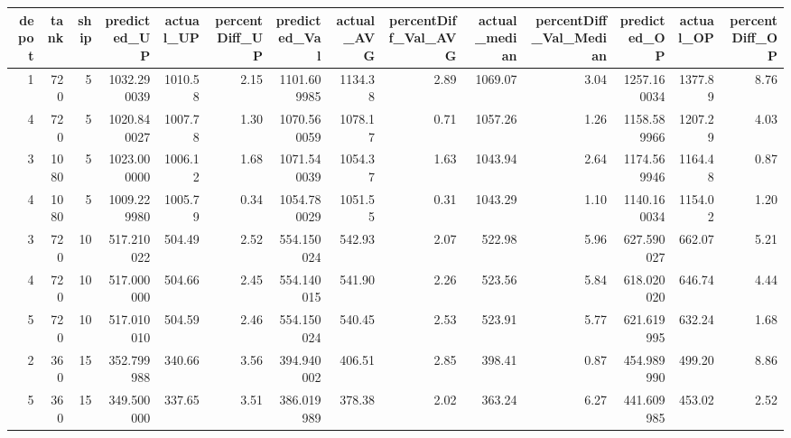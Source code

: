 \begin{tabular}{rrrrrrrrrrrrrr}
\toprule
 depot &  tank &  ship &  predicted\_UP &  actual\_UP &  percentDiff\_UP &  predicted\_Val &  actual\_AVG &  percentDiff\_Val\_AVG &  actual\_median &  percentDiff\_Val\_Median &  predicted\_OP &  actual\_OP &  percentDiff\_OP \\
\midrule
     1 &   720 &     5 &   1032.290039 &    1010.58 &            2.15 &    1101.609985 &     1134.38 &                 2.89 &        1069.07 &                    3.04 &   1257.160034 &    1377.89 &            8.76 \\
     4 &   720 &     5 &   1020.840027 &    1007.78 &            1.30 &    1070.560059 &     1078.17 &                 0.71 &        1057.26 &                    1.26 &   1158.589966 &    1207.29 &            4.03 \\
     3 &  1080 &     5 &   1023.000000 &    1006.12 &            1.68 &    1071.540039 &     1054.37 &                 1.63 &        1043.94 &                    2.64 &   1174.569946 &    1164.48 &            0.87 \\
     4 &  1080 &     5 &   1009.229980 &    1005.79 &            0.34 &    1054.780029 &     1051.55 &                 0.31 &        1043.29 &                    1.10 &   1140.160034 &    1154.02 &            1.20 \\
     3 &   720 &    10 &    517.210022 &     504.49 &            2.52 &     554.150024 &      542.93 &                 2.07 &         522.98 &                    5.96 &    627.590027 &     662.07 &            5.21 \\
     4 &   720 &    10 &    517.000000 &     504.66 &            2.45 &     554.140015 &      541.90 &                 2.26 &         523.56 &                    5.84 &    618.020020 &     646.74 &            4.44 \\
     5 &   720 &    10 &    517.010010 &     504.59 &            2.46 &     554.150024 &      540.45 &                 2.53 &         523.91 &                    5.77 &    621.619995 &     632.24 &            1.68 \\
     2 &   360 &    15 &    352.799988 &     340.66 &            3.56 &     394.940002 &      406.51 &                 2.85 &         398.41 &                    0.87 &    454.989990 &     499.20 &            8.86 \\
     5 &   360 &    15 &    349.500000 &     337.65 &            3.51 &     386.019989 &      378.38 &                 2.02 &         363.24 &                    6.27 &    441.609985 &     453.02 &            2.52 \\

\end{tabular}
